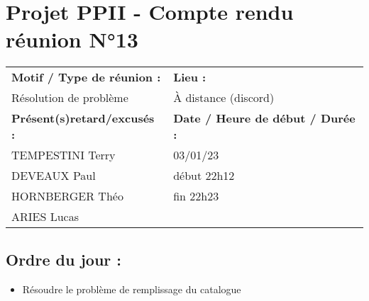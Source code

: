 \documentclass{article}
\begin{document}
\section*{Projet PPII - Compte rendu réunion N°13}
\begin{tabular}{|p{7cm}|p{6cm}|}
    \hline
    \textbf{Motif / Type de réunion :}
    & \textbf{Lieu :}
    \\
    Résolution de problème
    & 
    À distance (discord)
    \\ \hline
    \textbf{Présent(s)retard/excusés :}
    &
    \textbf{Date / Heure de début / Durée :}
    \\ 
    TEMPESTINI Terry &  03/01/23\\  
    DEVEAUX Paul & début 22h12\\
    HORNBERGER Théo & fin 22h23\\
    ARIES Lucas & 
    \\ \hline
\end{tabular}

\subsection*{Ordre du jour :}
\begin{itemize}
    \item{Résoudre le problème de remplissage du catalogue}
\end{itemize}
\end{document}
